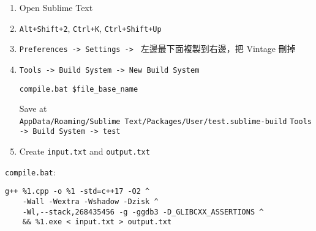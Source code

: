 \begin{enumerate}
    \item Open Sublime Text
    \item \texttt{Alt+Shift+2}, \texttt{Ctrl+K}, \texttt{Ctrl+Shift+Up}
    \item \texttt{Preferences -> Settings -> } 左邊最下面複製到右邊，把 Vintage 刪掉
    \item \texttt{Tools -> Build System -> New Build System}
\begin{lstlisting}
compile.bat $file_base_name
\end{lstlisting}
    Save at\\\texttt{AppData/Roaming/Sublime Text/Packages/User/test.sublime-build}
    \texttt{Tools -> Build System -> test}
    \item Create \texttt{input.txt} and \texttt{output.txt}
\end{enumerate}

\texttt{compile.bat}:
\begin{lstlisting}
g++ %1.cpp -o %1 -std=c++17 -O2 ^
    -Wall -Wextra -Wshadow -Dzisk ^
    -Wl,--stack,268435456 -g -ggdb3 -D_GLIBCXX_ASSERTIONS ^
    && %1.exe < input.txt > output.txt
\end{lstlisting}

